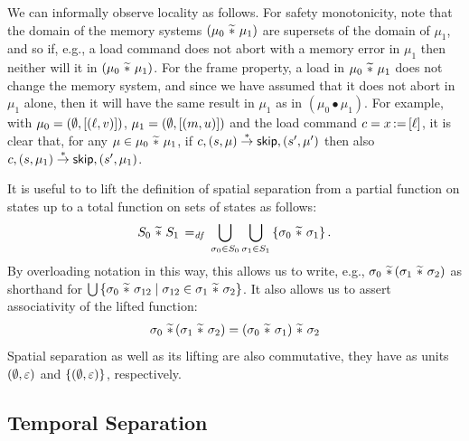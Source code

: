 \documentclass[11pt]{report}         %
\begin{document}
We can informally observe locality as follows. For safety monotonicity, note that the domain of the memory systems $(\mu_0 \operatorname{\,\widetilde{\ast}\,} \mu_1)$ are supersets of the domain of $\mu_1$, and so if, e.g., a load command does not abort with a memory error in $\mu_1$ then neither will it in $(\mu_0 \operatorname{\,\widetilde{\ast}\,} \mu_1)$. For the frame property, a load in $\mu_0 \operatorname{\,\widetilde{\ast}\,} \mu_1$ does not change the memory system, and since we have assumed that it does not abort in $\mu_1$ alone, then it will have the same result in $\mu_1$ as in $(\mu_0 \bullet \mu_1)$. For example, with $\mu_0 = (\operatorname{\emptyset},\left[(\ell,v)\right])$, $\mu_1 = (\operatorname{\emptyset},\left[(m,u)\right])$ and the load command $c = x \operatorname{:\!=} \left[ \ell \right]$, it is clear that, for any $\mu \in \mu_0 \operatorname{\,\widetilde{\ast}\,} \mu_1$, if $c,(s,\mu) \stackrel{\ast}{\rightarrow} \operatorname{\mathsf{skip}},(s',\mu')$ then also $c,(s,\mu_1) \stackrel{\ast}{\rightarrow} \operatorname{\mathsf{skip}},(s',\mu_1)$.

It is useful to to lift the definition of spatial separation from a partial function on states up to a total function on sets of states as follows: \[ S_0 \operatorname{\,\widetilde{\ast}\,} S_1 \operatorname{\;=_{\mathit{df}}\;} \bigcup_{\sigma_0 \in S_0} \bigcup_{\sigma_1 \in S_1} \left\lbrace \sigma_0 \operatorname{\,\widetilde{\ast}\,} \sigma_1 \right\rbrace.\] By overloading notation in this way, this allows us to write, e.g., $\sigma_0 \operatorname{\,\widetilde{\ast}\,} (\sigma_1 \operatorname{\,\widetilde{\ast}\,} \sigma_2)$ as shorthand for $\bigcup \left\lbrace \sigma_0 \operatorname{\,\widetilde{\ast}\,} \sigma_{12} \mid \sigma_{12} \in \sigma_1 \operatorname{\,\widetilde{\ast}\,} \sigma_2 \right\rbrace$. It also allows us to assert associativity of the lifted function: \[ \sigma_0 \operatorname{\,\widetilde{\ast}\,} (\sigma_1 \operatorname{\,\widetilde{\ast}\,} \sigma_2) = (\sigma_0 \operatorname{\,\widetilde{\ast}\,} \sigma_1) \operatorname{\,\widetilde{\ast}\,} \sigma_2 \] Spatial separation as well as its lifting are also commutative, they have as units $(\operatorname{\emptyset},\varepsilon)$ and $\left\lbrace (\operatorname{\emptyset},\varepsilon) \right\rbrace$, respectively. 

\subsection{Temporal Separation}
\label{sec:sequential-temporal-separation}
\end{document}
